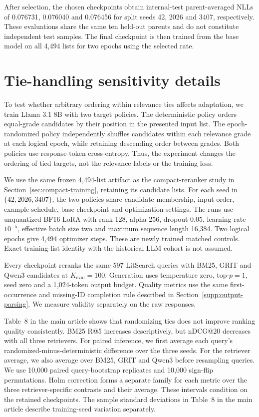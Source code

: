 \documentclass[pdflatex,sn-basic,Numbered]{sn-jnl}%
\theoremstyle{thmstyleone}%
\theoremstyle{thmstyletwo}%
\theoremstyle{thmstylethree}%
\begin{document}
After selection, the chosen checkpoints obtain internal-test parent-averaged
NLLs of 0.076731, 0.076040 and 0.076456 for split seeds 42, 2026 and 3407,
respectively. These evaluations share the same ten held-out parents and do not
constitute independent test samples. The final checkpoint is then trained from
the base model on all 4,494 lists for two epochs using the selected rate.

\FloatBarrier
\section{Tie-handling sensitivity details}
\label{supp:tie-details}

To test whether arbitrary ordering within relevance ties affects adaptation, we
train Llama 3.1 8B with two target policies. The deterministic policy orders
equal-grade candidates by their position in the presented input list. The
epoch-randomized policy independently shuffles candidates within each relevance
grade at each logical epoch, while retaining descending order between grades.
Both policies use response-token cross-entropy. Thus, the experiment changes
the ordering of tied targets, not the relevance labels or the training loss.

We use the same frozen 4,494-list artifact as the compact-reranker study in
Section~\ref{sec:compact-training}, retaining its candidate lists. For
each seed in $\{42,2026,3407\}$, the two policies share candidate membership,
input order, example schedule, base checkpoint and optimization settings.
The runs use unquantized BF16 LoRA with rank 128, alpha 256, dropout 0.05,
learning rate $10^{-5}$, effective batch size two and maximum sequence length
16,384. Two logical epochs give 4,494 optimizer steps. These are newly trained
matched controls. Exact training-list identity with the historical LLM cohort
is not assumed.

Every checkpoint reranks the same 597 LitSearch queries with BM25, GRIT and
Qwen3 candidates at $K_{\mathrm{eval}}=100$. Generation uses temperature zero,
top-$p=1$, seed zero and a 1,024-token output budget. Quality metrics use the
same first-occurrence and missing-ID completion rule described in
Section~\ref{supp:output-parsing}.
We measure validity separately on the raw responses.

Table~8 in the main article shows that randomizing ties does not improve
ranking quality consistently. BM25 R@5 increases descriptively, but nDCG@20
decreases with all three retrievers. For paired inference, we first average
each query's randomized-minus-deterministic difference over the three seeds.
For the retriever average, we also average over BM25, GRIT and Qwen3 before
resampling queries. We use 10,000 paired query-bootstrap replicates and
10,000 sign-flip permutations. Holm correction forms a separate family for
each metric over the three retriever-specific contrasts and their average.
These intervals condition on the retained checkpoints. The sample standard
deviations in Table~8 in the main article describe training-seed variation
separately.
\end{document}
